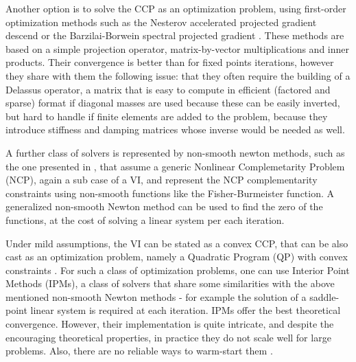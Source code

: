 \documentclass[final,3p]{elsarticle}
\begin{document}
Another option is to solve the CCP as an optimization problem, using first-order optimization methods such as 
the Nesterov accelerated projected gradient descend  
\cite{hammadTOG2015}
or the Barzilai-Borwein spectral projected gradient
\cite{heynIJNME2013}. These methods are based on a simple projection operator,  matrix-by-vector multiplications and inner products. Their convergence is better than for fixed points iterations, however they share with them the following issue: that they often require the building of a Delassus operator, a matrix that is easy to compute in efficient (factored and sparse) format if diagonal masses are used because these can be easily inverted, but hard to handle if finite elements are added to the problem, because they introduce stiffness and damping matrices whose inverse would be needed as well.

A further class of solvers is represented by non-smooth newton methods, such as the one presented in 
\cite{Macklin2019} %
, that assume a generic Nonlinear Complemetarity Problem (NCP), again a sub case of a VI, and represent the NCP complementarity constraints using non-smooth functions like the Fisher-Burmeister function. A generalized non-smooth Newton method can be used to find the zero of the functions, at the cost of solving a linear system per each iteration.

Under mild assumptions, the VI can be stated as a convex CCP, that can be also cast as an optimization problem, namely a Quadratic Program (QP) with convex constraints \cite{anitescuTasora2008}. For such a class of optimization problems, one can use Interior Point Methods (IPMs), a class of solvers that share some similarities with the above mentioned non-smooth Newton methods - for example the solution of a saddle-point linear system is required at each iteration. IPMs offer the best theoretical convergence. However, their implementation is quite intricate, and despite the encouraging theoretical properties, in practice they do not scale well for large problems. Also, there are no reliable ways to warm-start them
\cite{Mangoni2018}
.
\end{document}
